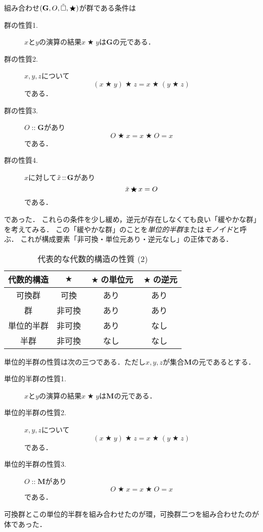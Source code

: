 \documentclass[twocolumn]{jsbook}
\newcommand{\mathAnyBinaryOperator}{\mathop{\bigstar}}
\newcommand{\mathSomething}{\square}
\newcommand{\mathIn}[1]{\mathop{::}#1}
\newcommand{\mathInverse}[1]{\Tilde{#1}}
\newcommand{\mathSet}[1]{\mathbf{#1}}
\newcommand{\mathGroup}[4]{(#1,#2,#3,#4)}
\newcommand{\keyword}[1]{\emph{#1}}
\begin{document}
組み合わせ$\mathGroup{\mathSet{G}}{O}{\mathInverse{\mathSomething}}{\mathAnyBinaryOperator}$が群である条件は
\begin{description}
\item[群の性質1.] $x$と$y$の演算の結果$x\mathAnyBinaryOperator y$は$\mathSet{G}$の元である．
\item[群の性質2.] $x,y,z$について$$(x\mathAnyBinaryOperator y)\mathAnyBinaryOperator z=x\mathAnyBinaryOperator(y\mathAnyBinaryOperator z)$$である．
\item[群の性質3.] $O\mathIn\mathSet{G}$があり$$O\mathAnyBinaryOperator x=x\mathAnyBinaryOperator O=x$$である．
\item[群の性質4.] $x$に対して$\mathInverse{x}\mathIn\mathSet{G}$があり$$\mathInverse{x}\mathAnyBinaryOperator x=O$$である．
\end{description}
であった．
これらの条件を少し緩め，逆元が存在しなくても良い「緩やかな群」を考えてみる．
この「緩やかな群」のことを\keyword{単位的半群}または\keyword{モノイド}と呼ぶ．
これが構成要素「非可換・単位元あり・逆元なし」の正体である．

\begin{table}
\caption{代表的な代数的構造の性質 (2)}
\label{tab:group-and-monoid}
\begin{center}
\begin{tabular}{||c||c|c|c||}
\hline
代数的構造&$\mathAnyBinaryOperator$&$\mathAnyBinaryOperator$の単位元&$\mathAnyBinaryOperator$の逆元\\
\hline\hline
可換群&可換&あり&あり\\
群&非可換&あり&あり\\
単位的半群&非可換&あり&なし\\
半群&非可換&なし&なし\\
\hline
\end{tabular}
\end{center}
\end{table}

単位的半群の性質は次の三つである．ただし$x,y,z$が集合$\mathSet{M}$の元であるとする．
\begin{description}
\item[単位的半群の性質1.] $x$と$y$の演算の結果$x\mathAnyBinaryOperator y$は$\mathSet{M}$の元である．
\item[単位的半群の性質2.] $x,y,z$について$$(x\mathAnyBinaryOperator y)\mathAnyBinaryOperator z=x\mathAnyBinaryOperator(y\mathAnyBinaryOperator z)$$である．
\item[単位的半群の性質3.] $O\mathIn\mathSet{M}$があり$$O\mathAnyBinaryOperator x=x\mathAnyBinaryOperator O=x$$である．
\end{description}
可換群とこの単位的半群を組み合わせたのが環，可換群二つを組み合わせたのが体であった．
\end{document}
